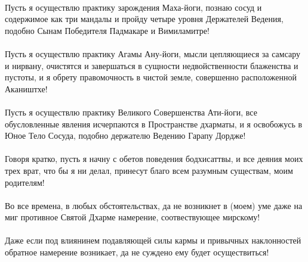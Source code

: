 \\
Пусть я осуществлю практику зарождения Маха-йоги,
познаю сосуд и содержимое как три мандалы и пройду четыре
уровня Держателей Ведения, подобно Сынам Победителя
Падмакаре и Вимиламитре!\\
\\
Пусть я осуществлю практику Агамы Ану-йоги, мысли
цепляю\-щиеся за самсару и нирвану, очистятся и завершаться
в сущности недвойственности блаженства и пустоты,
и я обрету правомочность в чистой земле, совершенно расположенной Акаништхе!\\
\\
Пусть я осуществлю практику Великого Совершенства Ати-йоги,
все обусловленные явления исчерпаются в Пространстве дхарматы,
и я освобожусь в Юное Тело Сосуда, подобно держателю Ведению Гарапу Дордже!\\
\\
Говоря кратко, пусть я начну с обетов поведения бодхисаттвы,
и все деяния моих трех врат, что бы я ни делал,
принесут благо всем разумным существам, моим родителям!\\
\\
Во все времена, в любых обстоятельствах, да не возникнет
в (моем) уме даже на миг противное Святой Дхарме намерение, соотвествующее мирскому!\\
\\
Даже если под влиянинем подавляющей силы кармы и привыч\-ных наклонностей 
обратное намерение возникает, да не сужде\-но ему будет осуществиться!\\

